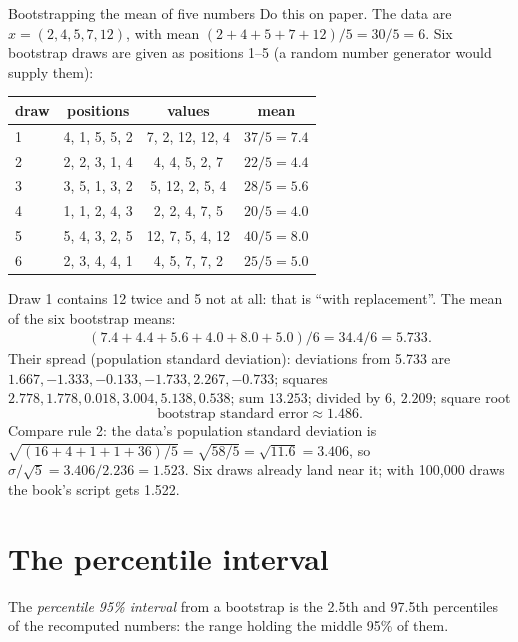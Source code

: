 \begin{worked}[label={we:bootstrap:five}]{Bootstrapping the mean of five numbers}
Do this on paper. The data are $x = (2, 4, 5, 7, 12)$, with mean $(2 + 4 + 5 + 7 + 12)/5 = 30/5 = 6$. Six bootstrap
draws are given\tagA{} as positions 1--5 (a random number generator would supply them):
\begin{center}
\begin{tabular}{lccc}
\toprule
draw & positions & values & mean \\
\midrule
1 & 4, 1, 5, 5, 2 & 7, 2, 12, 12, 4 & $37/5 = 7.4$ \\
2 & 2, 2, 3, 1, 4 & 4, 4, 5, 2, 7 & $22/5 = 4.4$ \\
3 & 3, 5, 1, 3, 2 & 5, 12, 2, 5, 4 & $28/5 = 5.6$ \\
4 & 1, 1, 2, 4, 3 & 2, 2, 4, 7, 5 & $20/5 = 4.0$ \\
5 & 5, 4, 3, 2, 5 & 12, 7, 5, 4, 12 & $40/5 = 8.0$ \\
6 & 2, 3, 4, 4, 1 & 4, 5, 7, 7, 2 & $25/5 = 5.0$ \\
\bottomrule
\end{tabular}
\end{center}
Draw 1 contains 12 twice and 5 not at all: that is ``with replacement''. The mean of the six bootstrap means:
\begin{align*}
(7.4 + 4.4 + 5.6 + 4.0 + 8.0 + 5.0)/6 = 34.4/6 = 5.733.
\end{align*}
Their spread (population standard deviation): deviations from 5.733 are $1.667, -1.333, -0.133, -1.733, 2.267, -0.733$;
squares $2.778, 1.778, 0.018, 3.004, 5.138, 0.538$; sum $13.253$; divided by 6, $2.209$; square root
\[
\text{bootstrap standard error} \approx 1.486.
\]
Compare rule 2: the data's population standard deviation is $\sqrt{(16 + 4 + 1 + 1 + 36)/5} = \sqrt{58/5} =
\sqrt{11.6} = 3.406$, so $\sigma/\sqrt5 = 3.406/2.236 = 1.523$. Six draws already land near it; with 100,000 draws the
book's script gets 1.522\tagC{}.
\end{worked}

\section{The percentile interval}\label{sec:bootstrap:percentile}

\begin{definition}
The \emph{percentile 95\% interval} from a bootstrap is the 2.5th and 97.5th percentiles of
the recomputed numbers: the range holding the middle 95\% of them.
\end{definition}


